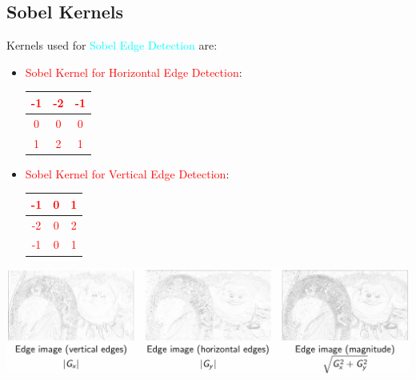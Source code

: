 \documentclass{book}
\begin{document}
\subsection{Sobel Kernels}
Kernels used for \textcolor{cyan}{Sobel Edge Detection} are:
\begin{itemize}
    \item \textcolor{red}{Sobel Kernel for Horizontal Edge Detection}:
    \begin{center}
        \textcolor{red}{
        \begin{tabular}{|c|c|c|}
            \hline
            -1 & -2 & -1 \\
            \hline
            0 & 0 & 0 \\
            \hline
            1 & 2 & 1 \\
            \hline
        \end{tabular}}
    \end{center}
    \item \textcolor{red}{Sobel Kernel for Vertical Edge Detection}:
    \begin{center}
        \textcolor{red}{
        \begin{tabular}{|c|c|c|}
            \hline
            -1 & 0 & 1 \\
            \hline
            -2 & 0 & 2 \\
            \hline
            -1 & 0 & 1 \\
            \hline
        \end{tabular}}
    \end{center}
\end{itemize}
\begin{center}
    \includegraphics[scale=0.3]{chapter 8/sobel_kernel.jpeg}
\end{center}
\end{document}
